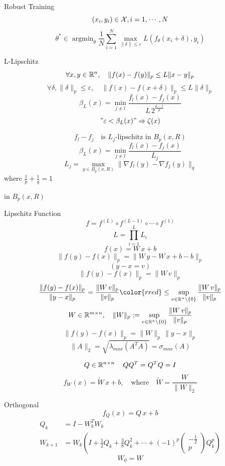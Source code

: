 \documentclass[aspectratio=169, 9pt]{beamer}
\theoremstyle{definition}
\DeclareMathOperator*{\argmin}{argmin}
\begin{document}
\begin{frame}{Robust Training}
  \[
    (x_i,y_i)\in\mathcal{X},i=1,\cdots,N
  \]
  \[
    \theta^*\in\argmin_\theta \frac{1}{N} \sum_{i=1}^N \max_{\|\delta\|\le
    \varepsilon} L(f_\theta(x_i+\delta), y_i)
  \]
\end{frame}
\begin{frame}{L-Lipschitz}
  \[
    \forall x,y\in\mathbb{R}^n,\quad \|f(x)-f(y)\|_p \le L\|x-y\|_p
  \]
  \[
    \forall \delta,\|\delta\|_p\le \varepsilon,\quad \|f(x)-f(x+\delta)\|_p\le
    L\|\delta\|_p
  \]
  \[
    \beta_L(x) = \min_{j\ne l} \frac{f_l(x) - f_j(x)}{L\,2^\frac{p-1}{p}}
  \]
  \[
    "\varepsilon< \beta_L(x)"\Rightarrow \zeta(x)
  \]
\end{frame}
\begin{frame}
  \[
    f_l - f_j\quad\mbox{is $L_j$-lipschitz in $B_p(x,R)$
}
  \]
  \[
    \beta_L(x) = \min_{j\ne l} \frac{f_l(x) - f_j(x)}{L_j}
  \]
  \[
    L_j = \max_{y\in B_p(x,R)} \|\nabla f_l(y) - \nabla f_j(y)\|_q
  \]
  where $\frac1p+\frac1q=1$

  in $B_p(x,R)$
\end{frame}
\begin{frame}{Lipschitz Function}
  \[
    f = f^{(L)}\circ f^{(L-1)}\circ\cdots\circ f^{(1)}
  \]
  \[
    L = \prod_{i=1}^L L_i
  \]
  \[
    f(x) = W\,x +b
  \]
  \[
    \|f(y) -f(x)\|_p = \|W\,y - W\,x + b-b\|_p
  \]
  \[
    (y-x = v)
  \]
  \[
    \|f(y) - f(x)\|_p = \|W\, v\|_p 
  \]
  \[
    \frac{\|f(y) - f(x)\|_p}{\|y-x\|_p} = \frac{\|W\, v\|_p}{\|v\|_p}
    {\color{rred} \le \sup_{v\in\R^n\setminus\{0\}}\frac{\|W\,v\|_p}{\|v\|_p}}
  \]
  \[
    W\in\R^{m\times n},\quad \|W\|_p :=\sup_{v\in\R^n\setminus\{0\}}\frac{\|W\,v\|_p}{\|v\|_p}

  \]
  \[
    \|f(y)-f(x)\|_p = \|W\|_p\,\|y-x\|_p
  \]
  \[
    \|A\|_2 = \sqrt{\lambda_{max} (A^TA)} = \sigma_{max}(A)
  \]
\end{frame}
\begin{frame}
  \[
    Q\in\mathbb{R}^{n\times n}\,\quad QQ^T = Q^TQ = I
  \]
  \[
    f_W(x) = \tilde W\, x + b,\quad\mbox{where}\quad \tilde W = \frac{W}{\|W\|_2}
  \]
\end{frame}
\begin{frame}{Orthogonal}
  \[
    f_Q(x) = Q\,x +b
  \]
    \begin{equation}
      \begin{aligned}
        Q_k &= I - W_k^TW_k\\ 
        W_{k+1} &= W_k\left( I + \frac12 Q_k+ \frac{3}{8}Q_k^2+\cdots+(-1)^p 
    \begin{pmatrix}
      -\frac12\\
      p
    \end{pmatrix} Q_k^p
  \right)
\end{aligned}
\end{equation}
\[
  W_0 = W
\]

\end{frame}
\end{document}
